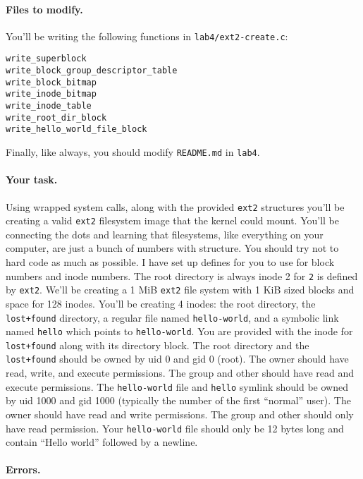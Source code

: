 \paragraph{Files to modify.}

You'll be writing the following functions in \texttt{lab4/ext2-create.c}:

\begin{lstlisting}
write_superblock
write_block_group_descriptor_table
write_block_bitmap
write_inode_bitmap
write_inode_table
write_root_dir_block
write_hello_world_file_block
\end{lstlisting}

Finally, like always, you should modify \texttt{README.md} in \texttt{lab4}.

\paragraph{Your task.}

Using wrapped system calls, along with the provided \texttt{ext2} structures
you'll be creating a valid \texttt{ext2} filesystem image that the kernel
could mount.
You'll be connecting the dots and learning that filesystems, like everything
on your computer, are just a bunch of numbers with structure.
You should try not to hard code as much as possible.
I have set up defines for you to use for block numbers and inode numbers.
The root directory is always inode 2 for \texttt{2} is defined by \texttt{ext2}.
We'll be creating a 1 MiB \texttt{ext2} file system with 1 KiB sized blocks
and space for 128 inodes.
You'll be creating 4 inodes: the root directory, the \lstinline|lost+found|
directory, a regular file named \texttt{hello-world}, and a symbolic link
named \texttt{hello} which points to \texttt{hello-world}.
You are provided with the inode for \lstinline|lost+found| along with its
directory block.
The root directory and the \lstinline|lost+found| should be owned by uid 0
and gid 0 (root).
The owner should have read, write, and execute permissions.
The group and other should have read and execute permissions.
The \lstinline|hello-world| file and \lstinline|hello| symlink should be
owned by uid 1000 and gid 1000 (typically the number of the first ``normal''
user).
The owner should have read and write permissions.
The group and other should only have read permission.
Your \lstinline|hello-world| file should only be 12 bytes long and contain
``Hello world'' followed by a newline.

\paragraph{Errors.}

